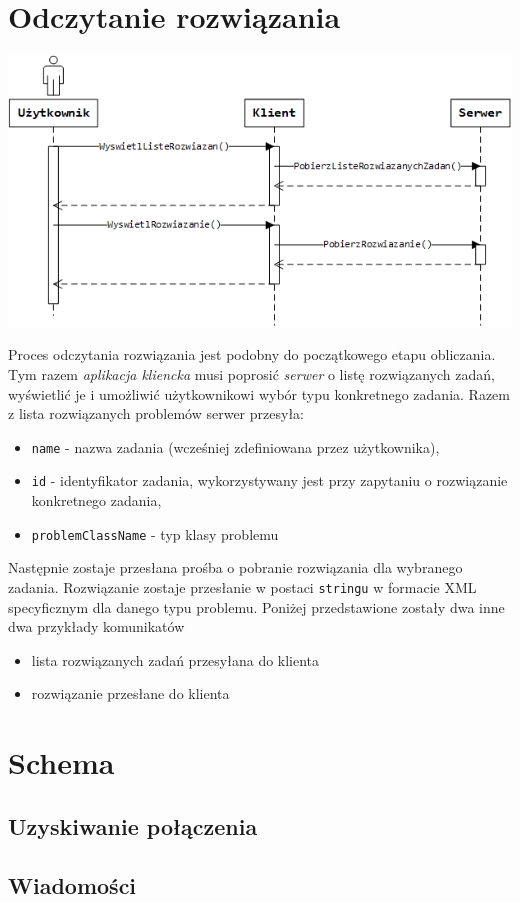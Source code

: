 \documentclass[12pt,a4paper,titlepage]{report}
\begin{document}
    \section{Odczytanie rozwiązania}
     \includegraphics[width=\textwidth]{img/communication/getresult.png}
     
    Proces odczytania rozwiązania jest podobny do początkowego etapu obliczania. Tym razem \textit{aplikacja kliencka} musi poprosić \textit{serwer} o listę rozwiązanych zadań, wyświetlić je i umożliwić użytkownikowi wybór typu konkretnego zadania. 
    Razem z lista rozwiązanych problemów serwer przesyła:
    \begin{itemize}
    	\item \verb+name+ - nazwa zadania (wcześniej zdefiniowana przez użytkownika),
    	\item \verb+id+ - identyfikator zadania, wykorzystywany jest przy zapytaniu o rozwiązanie konkretnego zadania,
    	\item \verb+problemClassName+ - typ klasy problemu
    \end{itemize}
    Następnie zostaje przesłana prośba o pobranie rozwiązania dla wybranego zadania. Rozwiązanie zostaje przesłanie w postaci
    \verb+stringu+ w formacie XML specyficznym dla danego typu problemu.
    Poniżej przedstawione zostały dwa inne dwa przykłady komunikatów
    \begin{itemize}
    \item lista rozwiązanych zadań przesyłana do klienta
				
	\item rozwiązanie przesłane do klienta
				
   \end{itemize}
    
   
    
  

	\section{Schema}
		\subsection{Uzyskiwanie połączenia}
		
		\subsection{Wiadomości}
		
	
	
\end{document}
